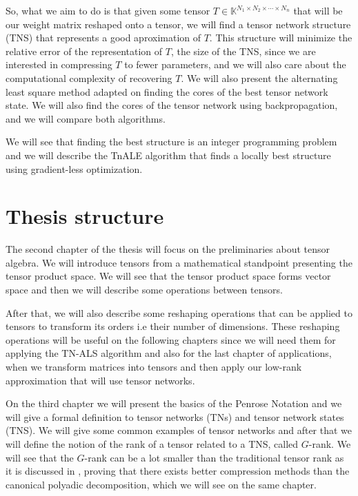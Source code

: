 \documentclass[11pt,a4paper,openright,oneside]{book}
\numberwithin{equation}{section}
\begin{document}
So, what we aim to do is that given some tensor $T \in \mathbb{K}^{N_1 \times N_2 \times \cdots \times N_n}$ that
will be our weight matrix reshaped onto a tensor, we will find a tensor network structure (TNS) that
represents a good aproximation of $T$. This structure will minimize the relative error of the representation of $T$,
the size of the TNS, since we are
interested in compressing $T$ to fewer parameters, and we will also care about the computational complexity of recovering
$T$. We will also present the alternating least square method adapted on finding the cores of the best tensor network state. 
We will also find the cores of the tensor network using backpropagation, and we will compare both algorithms.

We will see that finding the best structure is an integer programming problem and
we will describe the TnALE algorithm that finds a locally best structure using gradient-less optimization.


\newpage %
\section{Thesis structure}


The second chapter of the thesis will focus on the preliminaries about tensor algebra. We will introduce 
tensors from a mathematical standpoint presenting the tensor product space.
We will see that the tensor product space forms vector space and then we will describe
some operations between tensors.

After that, we will also describe some reshaping operations that can be applied to tensors to transform its
orders i.e their number of dimensions. These reshaping operations will be useful on the following chapters
since we will need them for applying the TN-ALS algorithm and also for the last chapter of applications, when
we transform matrices into tensors and then apply our low-rank approximation that will use tensor networks.

On the third chapter we will present the basics of the Penrose Notation and we will give a formal
definition to tensor networks (TNs) and tensor network states (TNS). We will give some
common examples of tensor networks and after that we will define the notion
of the rank of a tensor related to a TNS, called $G$-rank. We will see that the $G$-rank can be a lot smaller
than the traditional tensor rank as it is discussed in \cite{yeTensorNetworkRanks2019},
proving that there exists better compression methods than the canonical
polyadic decomposition, which we will see on the same chapter.
\end{document}
